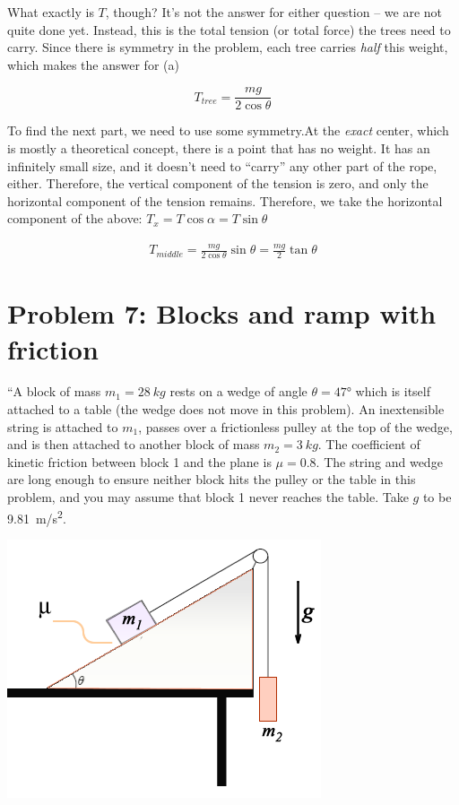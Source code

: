 \documentclass[8.01x]{subfiles}
\begin{document}
What exactly is $T$, though? It's not the answer for either question -- we are not quite done yet. Instead, this is the total tension (or total force) the trees need to carry. Since there is symmetry in the problem, each tree carries \emph{half} this weight, which makes the answer for (a)

\begin{equation}
T_{tree} = \frac{m g}{2 \cos \theta}
\end{equation}

To find the next part, we need to use some symmetry.At the \emph{exact} center, which is mostly a theoretical concept, there is a point that has no weight. It has an infinitely small size, and it doesn't need to ``carry'' any other part of the rope, either. Therefore, the vertical component of the tension is zero, and only the horizontal component of the tension remains. Therefore, we take the horizontal component of the above: $T_x = T \cos \alpha = T \sin \theta$

\begin{align}
T_{middle} = \frac{m g}{2 \cos \theta} \sin \theta = \frac{m g}{2} \tan \theta
\end{align}

\section{Problem 7: Blocks and ramp with friction}

``A block of mass $m_1 = \SI{28}{kg}$ rests on a wedge of angle $\theta = \ang{47}$ which is itself attached to a table (the wedge does not move in this problem). An inextensible string is attached to $m_1$, passes over a frictionless pulley at the top of the wedge, and is then attached to another block of mass $m_2 = \SI{3}{kg}$. The coefficient of kinetic friction between block 1 and the plane is $\mu = 0.8$. The string and wedge are long enough to ensure neither block hits the pulley or the table in this problem, and you may assume that block 1 never reaches the table. Take $g$ to be \SI{9.81}{m/s^2}.

\begin{center}
\includegraphics[scale=0.7]{Graphics/h3p7}
\end{center}
\end{document}
